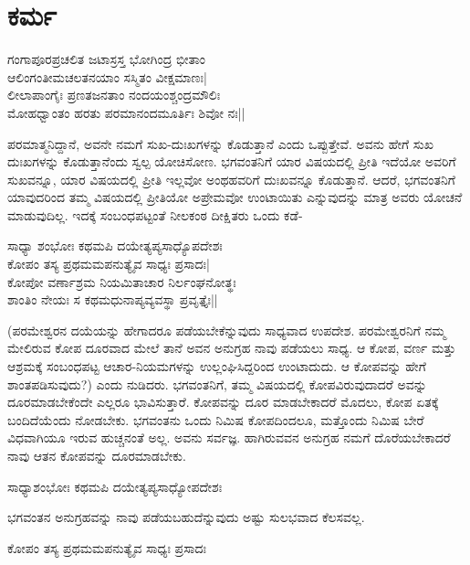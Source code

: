 \chapter{ಕರ್ಮ}\label{chap5}

\begin{shloka}
ಗಂಗಾಪೂರಪ್ರಚಲಿತ ಜಟಾಸ್ರಸ್ತ ಭೋಗಿಂದ್ರ ಭೀತಾಂ\\
ಆಲಿಂಗಂತೀಮಚಲತನಯಾಂ ಸಸ್ಮಿತಂ ವೀಕ್ಷಮಾಣಃ|\\
ಲೀಲಾಪಾಂಗೈಃ ಪ್ರಣತಜನತಾಂ ನಂದಯಂಶ್ಚಂದ್ರಮೌಲಿಃ\\
ಮೋಹಧ್ವಾಂತಂ ಹರತು ಪರಮಾನಂದಮೂರ್ತಿಃ ಶಿವೋ ನಃ||
\end{shloka}

ಪರಮಾತ್ಮನಿದ್ದಾನೆ, ಅವನೇ ನಮಗೆ ಸುಖ-ದುಃಖಗಳನ್ನು ಕೊಡುತ್ತಾನೆ ಎಂದು ಒಪ್ಪುತ್ತೇವೆ. ಅವನು ಹೇಗೆ ಸುಖ ದುಃಖಗಳನ್ನು ಕೊಡುತ್ತಾನೆಂದು ಸ್ವಲ್ಪ ಯೋಚಿಸೋಣ. ಭಗವಂತನಿಗೆ ಯಾರ ವಿಷಯದಲ್ಲಿ ಪ್ರೀತಿ ಇದೆಯೋ ಅವರಿಗೆ ಸುಖವನ್ನೂ, ಯಾರ ವಿಷಯದಲ್ಲಿ ಪ್ರೀತಿ ಇಲ್ಲವೋ ಅಂಥಹವರಿಗೆ ದುಃಖವನ್ನೂ ಕೊಡುತ್ತಾನೆ. ಆದರೆ, ಭಗವಂತನಿಗೆ ಯಾವುದರಿಂದ ತಮ್ಮ ವಿಷಯದಲ್ಲಿ ಪ್ರೀತಿಯೋ ಅಪ್ರೇಮವೋ ಉಂಟಾಯಿತು ಎನ್ನುವುದನ್ನು ಮಾತ್ರ ಅವರು ಯೋಚನೆ ಮಾಡುವುದಿಲ್ಲ. ಇದಕ್ಕೆ ಸಂಬಂಧಪಟ್ಟಂತೆ ನೀಲಕಂಠ ದೀಕ್ಷಿತರು ಒಂದು ಕಡೆ-

\begin{shloka}
ಸಾಧ್ಯಾ ಶಂಭೋಃ ಕಥಮಪಿ ದಯೇತ್ಯಪ್ಯಸಾಧ್ಯೊಪದೇಶಃ\\
ಕೋಪಂ ತಸ್ಯ ಪ್ರಥಮಮಪನುತ್ಯೈವ ಸಾಧ್ಯಃ ಪ್ರಸಾದಃ|\\
ಕೋಪೋ ವರ್ಣಾಶ್ರಮ ನಿಯಮಿತಾಚಾರ ನಿರ್ಲಂಘನೋತ್ಥಃ\\
ಶಾಂತಿಂ ನೇಯಃ ಸ ಕಥಮಧುನಾಪ್ಯವ್ಯವಸ್ಥಾ ಪ್ರವೃತ್ತೈಃ||
\end{shloka}

(ಪರಮೇಶ್ವರನ ದಯೆಯನ್ನು ಹೇಗಾದರೂ ಪಡೆಯಬೇಕೆನ್ನುವುದು ಸಾಧ್ಯವಾದ ಉಪದೇಶ. ಪರಮೇಶ್ವರನಿಗೆ ನಮ್ಮ ಮೇಲಿರುವ ಕೋಪ ದೂರವಾದ ಮೇಲೆ ತಾನೆ ಅವನ ಅನುಗ್ರಹ ನಾವು ಪಡೆಯಲು ಸಾಧ್ಯ. ಆ ಕೋಪ, ವರ್ಣ ಮತ್ತು ಆಶ್ರಮಕ್ಕೆ ಸಂಬಂಧಪಟ್ಟ ಆಚಾರ-ನಿಯಮಗಳನ್ನು ಉಲ್ಲಂಘಿಸಿದ್ದರಿಂದ ಉಂಟಾದುದು. ಆ ಕೋಪವನ್ನು ಹೇಗೆ ಶಾಂತಪಡಿಸುವುದು?) ಎಂದು ನುಡಿದರು. ಭಗವಂತನಿಗೆ, ತಮ್ಮ ವಿಷಯದಲ್ಲಿ ಕೋಪವಿರುವುದಾದರೆ ಅವನ್ನು ದೂರಮಾಡಬೇಕೆಂದೇ ಎಲ್ಲರೂ ಭಾವಿಸುತ್ತಾರೆ. ಕೋಪವನ್ನು ದೂರ ಮಾಡಬೇಕಾದರೆ ಮೊದಲು, ಕೋಪ ಏತಕ್ಕೆ ಬಂದಿದೆಯೆಂದು ನೋಡಬೇಕು. ಭಗವಂತನು ಒಂದು ನಿಮಿಷ ಕೋಪದಿಂದಲೂ, ಮತ್ತೊಂದು ನಿಮಿಷ ಬೇರೆ ವಿಧವಾಗಿಯೂ ಇರುವ ಹುಚ್ಚನಂತೆ ಅಲ್ಲ. ಅವನು ಸರ್ವಜ್ಞ. ಹಾಗಿರುವವನ ಅನುಗ್ರಹ ನಮಗೆ ದೊರೆಯಬೇಕಾದರೆ ನಾವು ಆತನ ಕೋಪವನ್ನು ದೂರಮಾಡಬೇಕು.

\begin{shloka}
ಸಾಧ್ಯಾಶಂಭೋಃ ಕಥಮಪಿ ದಯೇತ್ಯಪ್ಯಸಾಧ್ಯೋಪದೇಶಃ
\end{shloka}

ಭಗವಂತನ ಅನುಗ್ರಹವನ್ನು ನಾವು ಪಡೆಯಬಹುದೆನ್ನುವುದು ಅಷ್ಟು ಸುಲಭವಾದ ಕೆಲಸವಲ್ಲ.

\begin{shloka}
ಕೋಪಂ ತಸ್ಯ ಪ್ರಥಮಮಪನುತ್ಯೈವ ಸಾಧ್ಯಃ ಪ್ರಸಾದಃ
\end{shloka}

